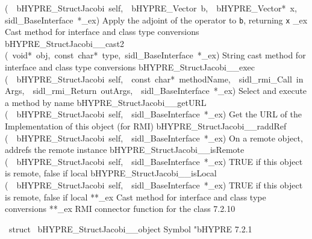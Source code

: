\documentclass{article}
\begin{document}
\begin{cxxentry}
\begin{cxxentry}
\begin{cxxnames}
        {(\ \ bHYPRE\_StructJacobi\ self,\ \ bHYPRE\_Vector\ b,\ \ bHYPRE\_Vector*\ x,\ \ sidl\_BaseInterface\ *\_ex)}
        {
Apply the adjoint of the operator to {\tt b}, returning {\tt x}}
        {}
\label{cxx.7.2.28}
        {\_ex}
        {}
        {
Cast method for interface and class type conversions}
        {}
\label{cxx.7.2.29}
        {bHYPRE\_StructJacobi\_\_cast2}
        {(\ void*\ obj,\ const\ char*\ type,\ sidl\_BaseInterface\ *\_ex)}
        {
String cast method for interface and class type conversions}
        {}
\label{cxx.7.2.30}
        {bHYPRE\_StructJacobi\_\_exec}
        {(\ \ bHYPRE\_StructJacobi\ self,\ \ const\ char*\ methodName,\ \ sidl\_rmi\_Call\ inArgs,\ \ sidl\_rmi\_Return\ outArgs,\ \ sidl\_BaseInterface\ *\_ex)}
        {
Select and execute a method by name}
        {}
\label{cxx.7.2.31}
        {bHYPRE\_StructJacobi\_\_getURL}
        {(\ \ bHYPRE\_StructJacobi\ self,\ \ sidl\_BaseInterface\ *\_ex)}
        {
Get the URL of the Implementation of this object (for RMI)}
        {}
\label{cxx.7.2.32}
        {bHYPRE\_StructJacobi\_\_raddRef}
        {(\ \ bHYPRE\_StructJacobi\ self,\ \ sidl\_BaseInterface\ *\_ex)}
        {
On a remote object, addrefs the remote instance}
        {}
\label{cxx.7.2.33}
        {bHYPRE\_StructJacobi\_\_isRemote}
        {(\ \ bHYPRE\_StructJacobi\ self,\ \ sidl\_BaseInterface\ *\_ex)}
        {
TRUE if this object is remote, false if local}
        {}
\label{cxx.7.2.34}
        {bHYPRE\_StructJacobi\_\_isLocal}
        {(\ \ bHYPRE\_StructJacobi\ self,\ \ sidl\_BaseInterface\ *\_ex)}
        {
TRUE if this object is remote, false if local}
        {}
\label{cxx.7.2.35}
        {**\_ex}
        {}
        {
Cast method for interface and class type conversions}
        {}
\label{cxx.7.2.36}
        {**\_ex}
        {}
        {
RMI connector function for the class}
        {7.2.10}
\end{cxxnames}
\begin{cxxvariable}
{\ struct\ }
        {bHYPRE\_StructJacobi\_\_object}
        {}
        {
Symbol "bHYPRE}
        {7.2.1}
\begin{cxxdoc}


\end{cxxdoc}
\end{cxxvariable}
\end{cxxentry}
\end{cxxentry}
\end{document}
